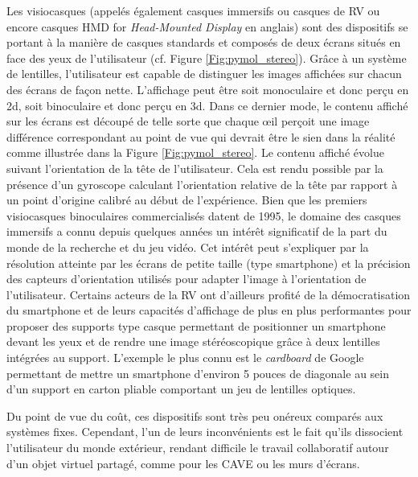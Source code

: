Les visiocasques (appelés également casques immersifs ou casques de RV ou encore casques HMD for \textit{Head-Mounted Display} en anglais) sont des dispositifs se portant à la manière de casques standards et composés de deux écrans situés en face des yeux de l'utilisateur (cf. Figure \ref{Fig:pymol_stereo}). Grâce à un système de lentilles, l'utilisateur est capable de distinguer les images affichées sur chacun des écrans de façon nette. L'affichage peut être soit monoculaire et donc perçu en 2d, soit binoculaire et donc perçu en 3d. Dans ce dernier mode, le contenu affiché sur les écrans est découpé de telle sorte que chaque œil perçoit une image différence correspondant au point de vue qui devrait être le sien dans la réalité comme illustrée dans la Figure \ref{Fig:pymol_stereo}. Le contenu affiché évolue suivant l'orientation de la tête de l'utilisateur. Cela est rendu possible par la présence d'un gyroscope calculant l'orientation relative de la tête par rapport à un point d'origine calibré au début de l'expérience. Bien que les premiers visiocasques binoculaires commercialisés datent de 1995, le domaine des casques immersifs a connu depuis quelques années un intérêt significatif de la part du monde de la recherche et du jeu vidéo. Cet intérêt peut s'expliquer par la résolution atteinte par les écrans de petite taille (type smartphone) et la précision des capteurs d'orientation utilisés pour adapter l'image à l'orientation de l'utilisateur. Certains acteurs de la RV ont d'ailleurs profité de la démocratisation du smartphone et de leurs capacités d'affichage de plus en plus performantes pour proposer des supports type casque permettant de positionner un smartphone devant les yeux et de rendre une image stéréoscopique grâce à deux lentilles intégrées au support. L'exemple le plus connu est le \textit{cardboard} de Google permettant de mettre un smartphone d'environ 5 pouces de diagonale au sein d'un support en carton pliable comportant un jeu de lentilles optiques. 

Du point de vue du coût, ces dispositifs sont très peu onéreux comparés aux systèmes fixes. Cependant, l'un de leurs inconvénients est le fait qu'ils dissocient l'utilisateur du monde extérieur, rendant difficile le travail collaboratif autour d'un objet virtuel partagé, comme pour les CAVE ou les murs d'écrans.

